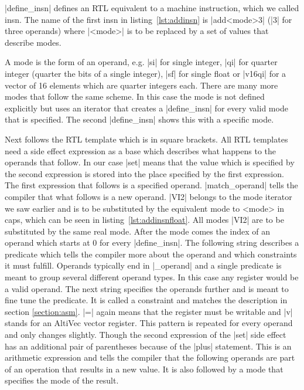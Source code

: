 {|define_insn| defines an \ac{RTL} equivalent to a machine instruction, which we called insn.
The name of the first insn in listing~\ref{lst:addinsn} is |add<mode>3| (|3| for three operands) where |<mode>| is to be replaced by a set of values that describe modes. \cite[ch.~16.9]{GCCint}

A mode is the form of an operand, e.g. |si| for single integer, |qi| for quarter integer (quarter the bits of a single integer), |sf| for single float or |v16qi| for a vector of 16 elements which are quarter integers each. \cite[ch.~13.6]{GCCint}
There are many more modes that follow the same scheme.
In this case the mode is not defined explicitly but uses an iterator that creates a |define_insn| for every valid mode that is specified. \cite[ch.~16.23]{GCCint}
The second |define_insn| shows this with a specific mode.

Next follows the \ac{RTL} template which is in square brackets.
All \ac{RTL} templates need a side effect expression as a base which describes what happens to the operands that follow.
In our case |set| means that the value which is specified by the second expression is stored into the place specified by the first expression. \cite[ch.~13.15]{GCCint}
The first expression that follows is a specified operand.
|match_operand| tells the compiler that what follows is a new operand.
|VI2| belongs to the mode iterator we saw earlier and is to be substituted by the equivalent mode to <mode> in caps, which can be seen  in listing~\ref{lst:addinsnfloat}.
All modes |VI2| are to be substituted by the same real mode.
After the mode comes the index of an operand which starts at 0 for every |define_insn|.
The following string describes a predicate which tells the compiler more about the operand and which constraints it must fulfill.
Operands typically end in |_operand| and a single predicate is meant to group several different operand types.
In this case any register would be a valid operand. \cite[ch.~16.7]{GCCint}
The next string specifies the operands further and is meant to fine tune the predicate.
It is called a constraint and matches the description in section \ref{section:asm}.
|=| again means that the register must be writable and |v| stands for an AltiVec vector register.\cite[ch.~16.8]{GCCint}
This pattern is repeated for every operand and only changes slightly.
Though the second expression of the |set| side effect has an additional pair of parentheses because of the |plus| statement.
This is an arithmetic expression and tells the compiler that the following operands are part of an operation that results in a new value.
It is also followed by a mode that specifies the mode of the result.\cite[ch.~13.9]{GCCint}

}

